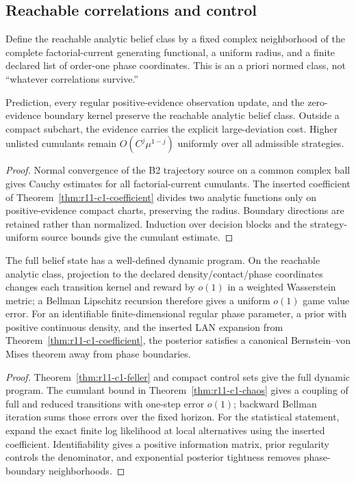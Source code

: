 \subsection{Reachable correlations and control}
Define the reachable analytic belief class by a fixed complex neighborhood of
the complete factorial-current generating functional, a uniform radius, and a
finite declared list of order-one phase coordinates.  This is an a priori
normed class, not ``whatever correlations survive.''

\begin{theorem}
\label{thm:r11-c1-chaos}
Prediction, every regular positive-evidence observation update, and the
zero-evidence boundary kernel preserve the reachable analytic belief class.
Outside a compact subchart, the evidence carries the explicit large-deviation
cost.  Higher unlisted cumulants remain $O(C^j\mu^{1-j})$ uniformly over all
admissible strategies.
\end{theorem}

\begin{proof}
Normal convergence of the B2 trajectory source on a common complex ball gives
Cauchy estimates for all factorial-current cumulants.  The inserted coefficient
of Theorem~\ref{thm:r11-c1-coefficient} divides two analytic functions only on
positive-evidence compact charts, preserving the radius.  Boundary directions
are retained rather than normalized.  Induction over decision blocks and the
strategy-uniform source bounds give the cumulant estimate.
\end{proof}

\begin{theorem}
\label{thm:r11-c1-game}
The full belief state has a well-defined dynamic program.  On the reachable
analytic class, projection to the declared density/contact/phase coordinates
changes each transition kernel and reward by $o(1)$ in a weighted Wasserstein
metric; a Bellman Lipschitz recursion therefore gives a uniform $o(1)$ game
value error.  For an identifiable finite-dimensional regular phase parameter,
a prior with positive continuous density, and the inserted LAN expansion from
Theorem~\ref{thm:r11-c1-coefficient}, the posterior satisfies a canonical
Bernstein--von Mises theorem away from phase boundaries.
\end{theorem}

\begin{proof}
Theorem~\ref{thm:r11-c1-feller} and compact control sets give the full dynamic
program.  The cumulant bound in Theorem~\ref{thm:r11-c1-chaos} gives a coupling
of full and reduced transitions with one-step error $o(1)$; backward Bellman
iteration sums those errors over the fixed horizon.  For the statistical
statement, expand the exact finite log likelihood at local alternatives using
the inserted coefficient.  Identifiability gives a positive information
matrix, prior regularity controls the denominator, and exponential posterior
tightness removes phase-boundary neighborhoods.
\end{proof}


